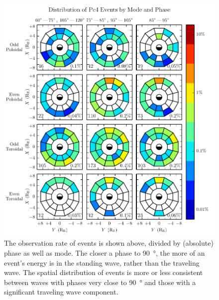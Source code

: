 \begin{figure}[!htb]
    \centering
    \includegraphics[width=\textwidth]{figures/mode_phase.pdf}
    \caption[Observation Rate of Pc4 Events by Mode and Phase]{
      The observation rate of events is shown above, divided by (absolute) phase as well as mode. The closer a phase to \SI{90}{\degree}, the more of an event's energy is in the standing wave, rather than the traveling wave. The spatial distribution of events is more or less consistent between waves with phases very close to \SI{90}{\degree} and those with a significant traveling wave component. 
    }
    \label{fig_mode_phase}
\end{figure}



